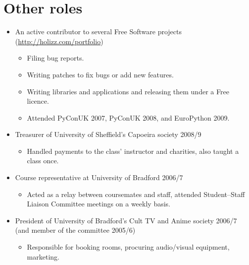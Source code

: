 \documentclass{article}
\newcommand{\iri}[1]{\url{#1}}
\begin{document}
\section{Other roles}
\begin{itemize}
\item An active contributor to several Free Software projects (\iri{http://holizz.com/portfolio})
  \begin{itemize}
  \item Filing bug reports.
  \item Writing patches to fix bugs or add new features.
  \item Writing libraries and applications and releasing them under a Free licence.
  \item Attended PyConUK 2007, PyConUK 2008, and EuroPython 2009.
  \end{itemize}
\item Treasurer of University of Sheffield's Capoeira society 2008/9
  \begin{itemize}
  \item Handled payments to the class' instructor and charities, also taught a class once.
  \end{itemize}
\item Course representative at University of Bradford 2006/7
  \begin{itemize}
  \item Acted as a relay between coursemates and staff, attended Student--Staff Liaison Committee meetings on a weekly basis.
  \end{itemize}
\item President of University of Bradford's Cult TV and Anime society 2006/7 (and member of the committee 2005/6)
  \begin{itemize}
  \item Responsible for booking rooms, procuring audio/visual equipment, marketing.
  \end{itemize}
\end{itemize}

\break
\end{document}
